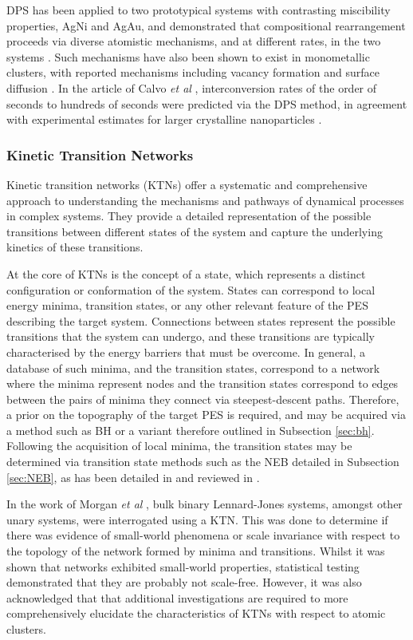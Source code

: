 DPS has been applied to two prototypical systems with contrasting miscibility properties, AgNi and AgAu, and demonstrated that compositional rearrangement proceeds via diverse atomistic mechanisms, and at different rates, in the two systems \cite{Calvo2013-hj}. Such mechanisms have also been shown to exist in monometallic clusters, with reported mechanisms including vacancy formation and surface diffusion \cite{doi:10.1021/jp952521s}. In the article of Calvo \textit{et al} \cite{Calvo2013-hj}, interconversion rates  of the order of seconds to hundreds of seconds were predicted via the DPS method, in agreement with experimental estimates for larger crystalline nanoparticles \cite{https://doi.org/10.1002/smll.201001138,https://doi.org/10.1002/smll.200801169}. 

\subsubsection{Kinetic Transition Networks}
\label{sec:ktn}
Kinetic transition networks (KTNs) offer a systematic and comprehensive approach to understanding the mechanisms and pathways of dynamical processes in complex systems. They provide a detailed representation of the possible transitions between different states of the system and capture the underlying kinetics of these transitions.

At the core of KTNs is the concept of a state, which represents a distinct configuration or conformation of the system. States can correspond to local energy minima, transition states, or any other relevant feature of the PES describing the target system. Connections between states represent the possible transitions that the system can undergo, and these transitions are typically characterised by the energy barriers that must be overcome. In general, a database of such minima, and the transition states, correspond to a network where the minima represent nodes and the transition states correspond to edges between the pairs of minima they connect via steepest-descent paths. Therefore, a prior on the topography of the target PES is required, and may be acquired via a method such as BH or a variant therefore outlined in Subsection \ref{sec:bh}. Following the acquisition of local minima, the transition states may be determined via  transition state methods such as the NEB detailed in Subsection \ref{sec:NEB}, as has been detailed in \cite{C7CP03346J} and reviewed in \cite{doi:10.1146/annurev-physchem-050317-021219}. 

In the work of Morgan \textit{et al} \cite{C7CP03346J}, bulk binary Lennard-Jones systems, amongst other unary systems, were interrogated using a KTN. This was done to determine if there was evidence of small-world phenomena or scale invariance  with respect to the topology of the network formed by minima and transitions. Whilst it was shown that networks exhibited small-world properties,  statistical testing demonstrated that they are probably not scale-free. However, it was also acknowledged that that additional investigations are required to more comprehensively elucidate the characteristics of KTNs with respect to atomic clusters.

